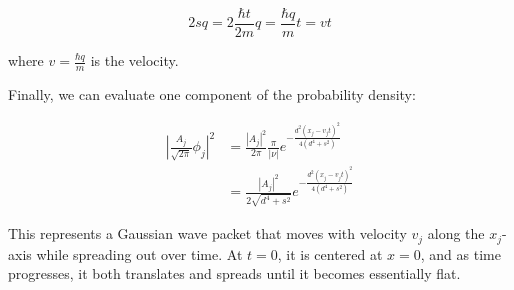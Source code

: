 \begin{equation}
2sq = 2\frac{\hbar t}{2m}q = \frac{\hbar q}{m}t = vt
\end{equation}

where $v = \frac{\hbar q}{m}$ is the velocity.

Finally, we can evaluate one component of the probability density:

\begin{align}
\left|\frac{A_j}{\sqrt{2\pi}}\phi_j\right|^2 &= \frac{|A_j|^2}{2\pi}\frac{\pi}{|\nu|}e^{-\frac{d^2(x_j-v_jt)^2}{4(d^4+s^2)}} \\
&= \frac{|A_j|^2}{2\sqrt{d^4+s^2}}e^{-\frac{d^2(x_j-v_jt)^2}{4(d^4+s^2)}}
\end{align}

This represents a Gaussian wave packet that moves with velocity $v_j$ along the $x_j$-axis while spreading out over time. At $t=0$, it is centered at $x=0$, and as time progresses, it both translates and spreads until it becomes essentially flat.
